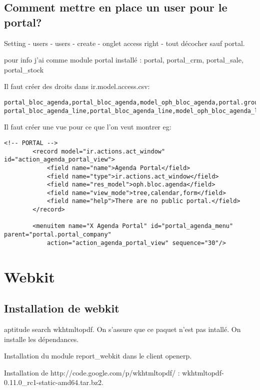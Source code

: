 \documentclass[12pt,a4paper]{article}
\begin{document}
\subsection{Comment mettre en place un user pour le portal?}
\label{sec:portal_user}

Setting - users - users - create - onglet access right - tout décocher sauf portal.

pour info j'ai comme module portal installé : portal, portal\_crm, portal\_sale, portal\_stock

Il faut créer des droits dans ir.model.access.csv:
\begin{verbatim}
portal_bloc_agenda,portal_bloc_agenda,model_oph_bloc_agenda,portal.group_portal,1,0,0,0
portal_bloc_agenda_line,portal_bloc_agenda_line,model_oph_bloc_agenda_line,portal.group_portal,1,0,0,0
\end{verbatim}

Il faut créer une vue pour ce que l'on veut montrer eg:

\begin{verbatim}
<!-- PORTAL -->
        <record model="ir.actions.act_window" id="action_agenda_portal_view">
            <field name="name">Agenda Portal</field>
            <field name="type">ir.actions.act_window</field>
            <field name="res_model">oph.bloc.agenda</field>
            <field name="view_mode">tree,calendar,form</field>
            <field name="help">There are no public portal.</field>
        </record>

        <menuitem name="X Agenda Portal" id="portal_agenda_menu" parent="portal.portal_company"
            action="action_agenda_portal_view" sequence="30"/>
\end{verbatim}

\section{Webkit}
\label{sec:webkit}


\subsection{Installation de webkit}
\label{sec:install_webkit}


aptitude search wkhtmltopdf. On s'assure que ce paquet n'est pas intallé.
On installe les dépendances. 

Installation du module report\_webkit dans le client openerp.

Installation de http://code.google.com/p/wkhtmltopdf/ : wkhtmltopdf-0.11.0\_rc1-static-amd64.tar.bz2.
\end{document}
